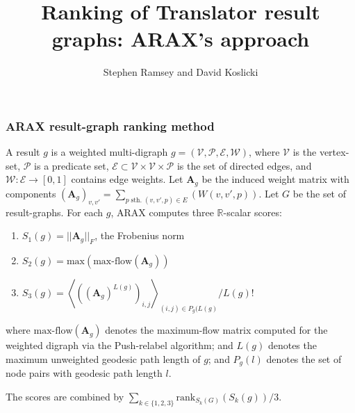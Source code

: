 \documentclass{beamer}
\title{Ranking of Translator result graphs: ARAX's approach}
\author{Stephen Ramsey and David Koslicki}
\institute{Team Expander Agent}
\begin{document}
\frame{\titlepage}
\begin{frame}
  \frametitle{ARAX result-graph ranking method} A result $g$ is a weighted
  multi-digraph $g = ({\mathcal V}, {\mathcal P}, {\mathcal E}, {\mathcal W})$,
  where ${\mathcal V}$ is the vertex-set, ${\mathcal P}$ is a predicate set,
  ${\mathcal E} \subset {\mathcal V} \times {\mathcal V} \times {\mathcal P}$ is
  the set of directed edges, and ${\mathcal W}: {\mathcal E} \rightarrow [0,1]$
  contains edge weights. Let $\boldsymbol{A}_g$ be the induced weight matrix
  with components $(\boldsymbol{A}_g)_{v,v'} = \sum_{p \; \textrm{sth.} \;
    (v,v',p) \in E}(W(v,v',p))$.  Let $G$ be the set of result-graphs. For each
  $g$, ARAX computes three $\mathbb{R}$-scalar scores:
  \begin{enumerate}
  \item $S_1(g) = ||\boldsymbol{A}_g||_F$, the Frobenius norm
  \item $S_2(g) = \textrm{max}\left( \textrm{max-flow}(\boldsymbol{A}_g) \right)$
  \item $S_3(g) = \left\langle ((\boldsymbol{A}_g)^{L(g)})_{i,j}\right\rangle_{(i,j) \in P_g(L(g)}/L(g)!$
  \end{enumerate}
  where $\textrm{max-flow}(\boldsymbol{A}_g)$ denotes the maximum-flow matrix
  computed for the weighted digraph via the Push-relabel algorithm; and $L(g)$ denotes
  the maximum unweighted geodesic path length of $g$; and
  $P_g(l)$ denotes the set of node pairs with geodesic path length $l$.

  The scores are combined by $\sum_{k \in \{1,2,3\}}\textrm{rank}_{S_k(G)}(S_k(g))/3$.
\end{frame}
\end{document}

